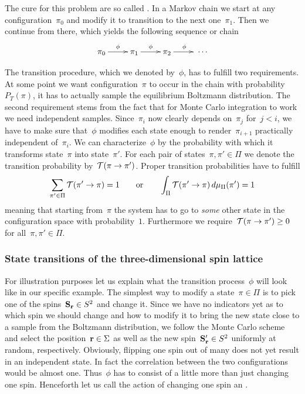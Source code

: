 The cure for this problem are so called . In a Markov
chain we start at any configuration~$\pi_0$ and modify it to transition to the
next one~$\pi_1$. Then we continue from there, which yields the following
sequence or chain
%
\begin{equation}
  \xymatrix{\pi_0 \ar[r]^{\phi} &\pi_1 \ar[r]^{\phi} &\pi_2 \ar[r]^{\phi}
  &\;\cdots}
\end{equation}

The transition procedure, which we denoted by~$\phi$, has to fulfill two
requirements. At some point we want configuration~$\pi$ to occur in the chain
with probability~$P_T(\pi)$, \ie{} it has to actually sample the equilibrium
Boltzmann distribution. The second requirement stems from the fact that for
Monte Carlo integration to work we need independent samples. Since~$\pi_{i}$ now
clearly depends on~$\pi_j$ for~$j < i$, we have to make sure that~$\phi$
modifies each state enough to render~$\pi_{i+1}$ practically independent
of~$\pi_i$. We can characterize~$\phi$ by the probability with which it
transforms state~$\pi$ into state~$\pi'$. For each pair of states~$\pi, \pi' \in
\Pi$ we denote the transition probability by~$\mathcal{T}(\pi \to \pi')$. Proper
transition probabilities have to fulfill
%
\begin{equation}\label{probprop}
  \sum_{\pi' \in \Pi} \mathcal{T}(\pi' \to \pi) = 1 \qquad\text{or}\qquad
  \int_{\Pi} \mathcal{T}(\pi' \to \pi) \,d\mu_{\Pi}(\pi') = 1
\end{equation}
%
meaning that starting from~$\pi$ the system has to go to \emph{some} other state
in the configuration space with probability~$1$. Furthermore we require~$\mathcal{T}(\pi
\to \pi') \ge 0$ for all~$\pi, \pi' \in \Pi$.

\subsubsection{State transitions of the three-dimensional spin lattice}

For illustration purposes let us explain what the transition process~$\phi$ will
look like in our specific example. The simplest way to modify a state~$\pi \in
\Pi$ is to pick one of the spins~$\mathbf{S}_{\mathbf{r}} \in S^2$ and change it. Since we have
no indicators yet as to which spin we should change and how to modify it to
bring the new state close to a sample from the Boltzmann distribution, we follow
the Monte Carlo scheme and select the position~$\mathbf{r} \in \Sigma$ as well as the
new spin~$\mathbf{S}'_{\mathbf{r}}\in S^2$ uniformly at random, respectively. Obviously, flipping
one spin out of many does not yet result in an independent state. In fact the
correlation between the two configurations would be almost one. Thus~$\phi$ has
to consist of a little more than just changing one spin. Henceforth let us call
the action of changing one spin an .


